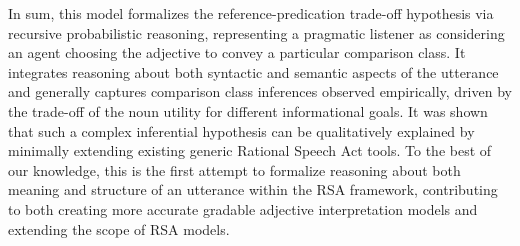 In sum, this model formalizes the reference-predication trade-off hypothesis via recursive probabilistic reasoning, representing a pragmatic listener as considering an agent choosing the adjective to convey a particular comparison class. It integrates reasoning about both syntactic and semantic aspects of the utterance and generally captures comparison class inferences observed empirically, driven by the trade-off of the noun utility for different informational goals. It was shown that such a complex inferential hypothesis can be qualitatively explained by minimally extending existing generic Rational Speech Act tools. To the best of our knowledge, this is the first attempt to formalize reasoning about both meaning and structure of an utterance within the RSA framework,  contributing to both creating more accurate gradable adjective interpretation models and extending the scope of RSA models. 
